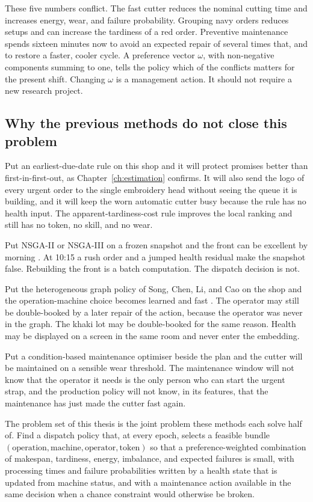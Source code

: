 These five numbers conflict. The fast cutter reduces the nominal cutting time and increases energy, wear, and failure probability. Grouping navy orders reduces setups and can increase the tardiness of a red order. Preventive maintenance spends sixteen minutes now to avoid an expected repair of several times that, and to restore a faster, cooler cycle. A preference vector \(\omega\), with non-negative components summing to one, tells the policy which of the conflicts matters for the present shift. Changing \(\omega\) is a management action. It should not require a new research project.

\subsection{Why the previous methods do not close this problem}

Put an earliest-due-date rule on this shop and it will protect promises better than first-in-first-out, as Chapter~\ref{ch:estimation} confirms. It will also send the logo of every urgent order to the single embroidery head without seeing the queue it is building, and it will keep the worn automatic cutter busy because the rule has no health input. The apparent-tardiness-cost rule improves the local ranking and still has no token, no skill, and no wear.

Put NSGA-II or NSGA-III on a frozen snapshot and the front can be excellent by morning \cite{deb2002,deb2014,gong2019}. At 10:15 a rush order and a jumped health residual make the snapshot false. Rebuilding the front is a batch computation. The dispatch decision is not.

Put the heterogeneous graph policy of Song, Chen, Li, and Cao on the shop and the operation-machine choice becomes learned and fast \cite{song2023}. The operator may still be double-booked by a later repair of the action, because the operator was never in the graph. The khaki lot may be double-booked for the same reason. Health may be displayed on a screen in the same room and never enter the embedding.

Put a condition-based maintenance optimiser beside the plan \cite{cbm2024,pandhare2024,wang2024cie} and the cutter will be maintained on a sensible wear threshold. The maintenance window will not know that the operator it needs is the only person who can start the urgent strap, and the production policy will not know, in its features, that the maintenance has just made the cutter fast again.

The problem set of this thesis is the joint problem these methods each solve half of. Find a dispatch policy that, at every epoch, selects a feasible bundle \((\text{operation},\text{machine},\text{operator},\text{token})\) so that a preference-weighted combination of makespan, tardiness, energy, imbalance, and expected failures is small, with processing times and failure probabilities written by a health state that is updated from machine status, and with a maintenance action available in the same decision when a chance constraint would otherwise be broken.

